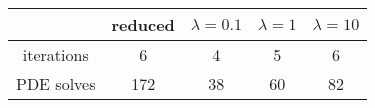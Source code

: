 \begin{tabular}{ccccc}
& reduced & $\lambda = 0.1$ & $\lambda = 1$ & $\lambda = 10$ \\
\hline
iterations & 6 & 4 & 5 & 6 \\
PDE solves & 172 & 38 & 60 & 82 \\
\hline
\end{tabular}
